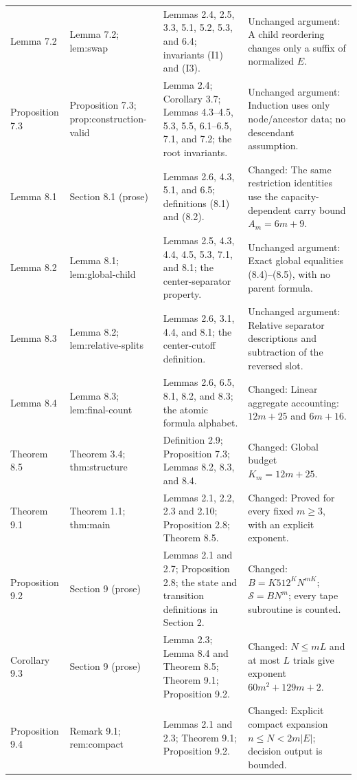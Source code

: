 {\begin{longtable}{@{}L{2.6cm}L{3.2cm}L{3.7cm}L{5.1cm}@{}}
Lemma 7.2 & Lemma 7.2; \textsf{lem:\allowbreak swap} & Lemmas 2.4, 2.5, 3.3, 5.1, 5.2, 5.3, and 6.4; invariants (I1) and (I3). & Unchanged argument: A child reordering changes only a suffix of normalized \(E\).\\[3pt]
Proposition 7.3 & Proposition 7.3; \textsf{prop:\allowbreak construction-\allowbreak valid} & Lemma 2.4; Corollary 3.7; Lemmas 4.3--4.5, 5.3, 5.5, 6.1--6.5, 7.1, and 7.2; the root invariants. & Unchanged argument: Induction uses only node/ancestor data; no descendant assumption.\\[3pt]
Lemma 8.1 & Section 8.1 (prose) & Lemmas 2.6, 4.3, 5.1, and 6.5; definitions (8.1) and (8.2). & Changed: The same restriction identities use the capacity-dependent carry bound $A_m=6m+9$.\\[3pt]
Lemma 8.2 & Lemma 8.1; \textsf{lem:\allowbreak global-\allowbreak child} & Lemmas 2.5, 4.3, 4.4, 4.5, 5.3, 7.1, and 8.1; the center-separator property. & Unchanged argument: Exact global equalities (8.4)--(8.5), with no parent formula.\\[3pt]
Lemma 8.3 & Lemma 8.2; \textsf{lem:\allowbreak relative-\allowbreak splits} & Lemmas 2.6, 3.1, 4.4, and 8.1; the center-cutoff definition. & Unchanged argument: Relative separator descriptions and subtraction of the reversed slot.\\[3pt]
Lemma 8.4 & Lemma 8.3; \textsf{lem:\allowbreak final-\allowbreak count} & Lemmas 2.6, 6.5, 8.1, 8.2, and 8.3; the atomic formula alphabet. & Changed: Linear aggregate accounting: \(12m+25\) and \(6m+16\).\\[3pt]
Theorem 8.5 & Theorem 3.4; \textsf{thm:\allowbreak structure} & Definition 2.9; Proposition 7.3; Lemmas 8.2, 8.3, and 8.4. & Changed: Global budget \(K_m=12m+25\).\\[3pt]
Theorem 9.1 & Theorem 1.1; \textsf{thm:\allowbreak main} & Lemmas 2.1, 2.2, 2.3 and 2.10; Proposition 2.8; Theorem 8.5. & Changed: Proved for every fixed \(m\geq3\), with an explicit exponent.\\[3pt]
Proposition 9.2 & Section 9 (prose) & Lemmas 2.1 and 2.7; Proposition 2.8; the state and transition definitions in Section 2. & Changed: $B=K512^KN^{mK}$; $\mathcal{S}=BN^m$; every tape subroutine is counted.\\[3pt]
Corollary 9.3 & Section 9 (prose) & Lemma 2.3; Lemma 8.4 and Theorem 8.5; Theorem 9.1; Proposition 9.2. & Changed: $N\leq mL$ and at most $L$ trials give exponent $60m^2+129m+2$.\\[3pt]
Proposition 9.4 & Remark 9.1; \textsf{rem:\allowbreak compact} & Lemmas 2.1 and 2.3; Theorem 9.1; Proposition 9.2. & Changed: Explicit compact expansion $n\leq N<2m|E|$; decision output is bounded.\\[3pt]
\end{longtable}}